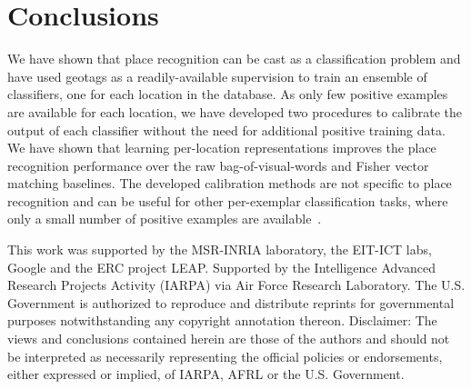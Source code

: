 \section{Conclusions}
We have shown that place recognition can be cast as a classification problem and have used geotags as a readily-available supervision to
train an ensemble of classifiers, one for each location in the database. As only few positive examples are available for each
location, we have developed two procedures to calibrate the output of each classifier without the need for additional positive training
data. We have shown that learning per-location representations improves the place recognition performance over the raw bag-of-visual-words and
Fisher vector matching baselines. The developed calibration methods are not specific to place recognition and can be useful for other
per-exemplar classification tasks, where only a small number of positive examples are available~\cite{Malisiewicz11}.



\begin{acknowledgements}
   This work was supported by the MSR-INRIA laboratory, the EIT-ICT labs, Google and the ERC project LEAP.
   {
   \noindent
   Supported by the Intelligence Advanced Research Projects Activity (IARPA) via Air Force Research Laboratory. The U.S. Government is authorized to reproduce and distribute reprints for governmental purposes notwithstanding any copyright annotation thereon. Disclaimer:  The views and conclusions contained herein are those of the authors and should not be interpreted as necessarily representing the official policies or endorsements, either expressed or implied, of IARPA, AFRL or the U.S. Government.
   }
\end{acknowledgements}




{\footnotesize

}

